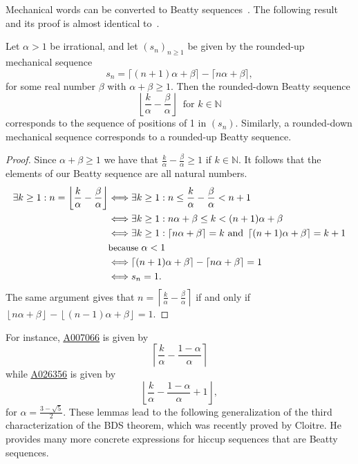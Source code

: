 \documentclass[12pt,reqno]{article}
\newcommand{\seqnum}[1]{\href{https://oeis.org/#1}{\rm \underline{#1}}}
\begin{document}
Mechanical words can be converted to Beatty sequences~\cite{beatty}.
The following result and its proof is almost identical to~\cite[Lemma 1]{bosma2018}.
\begin{lemma} Let $\alpha > 1$ be irrational, and let $(s_n)_{n \geq 1}$ be given by
the rounded-up mechanical sequence
\[ s_n=\lceil (n+1)\alpha  +\beta\rceil - \lceil n\alpha +\beta\rceil, \]
for some real number $\beta$ with $\alpha + \beta \geq 1$.
Then the rounded-down Beatty sequence
\[
\left\lfloor \frac k\alpha -\frac \beta \alpha \right\rfloor\ \text{ for }k\in \mathbb N
\]
corresponds to the sequence of positions of 1 in $(s_n)$. Similarly, a rounded-down
mechanical sequence corresponds to a rounded-up Beatty sequence.
\end{lemma}
\begin{proof} 
Since $\alpha+\beta\geq 1$ we have that $\frac k\alpha -\frac \beta \alpha\geq 1$ if $k\in\mathbb N$.
It follows that the elements of our Beatty sequence are all natural numbers.
\[
\begin{aligned}
\exists k \geq 1 : n = \left\lfloor \frac k\alpha -\frac \beta \alpha \right\rfloor 
&\Longleftrightarrow \exists k \geq 1 : n \leq \frac k\alpha -\frac \beta \alpha < n + 1 \\
&\Longleftrightarrow \exists k \geq 1 : {n\alpha+\beta} \leq k < {(n+1)\alpha+\beta} \\
&\Longleftrightarrow \exists k \geq 1 : 
\left\lceil{n\alpha+\beta} \right\rceil = k  
\text{ and } 
\left\lceil {(n+1)\alpha+\beta} \right\rceil = k + 1 \\
&\text{\small because }\alpha<1\\
&\Longleftrightarrow 
\left\lceil {(n+1)\alpha+\beta} \right\rceil 
- \left\lceil {n\alpha+\beta} \right\rceil = 1 \\
&\Longleftrightarrow s_n = 1.
\end{aligned}
\]
The same argument gives that $ n = \left\lceil \frac k\alpha -\frac \beta \alpha \right\rceil $
if and only if $\left\lfloor {n\alpha+\beta} \right\rfloor 
- \left\lfloor {(n-1)\alpha+\beta} \right\rfloor = 1$.
\end{proof}

For instance, \seqnum{A007066} is given by
\[
\left\lceil \frac{k}{\alpha}-\frac{1-\alpha}{\alpha}\right\rceil 
\]
while \seqnum {A026356} is given by
\[
\left\lfloor \frac{k}{\alpha}-\frac{1-\alpha}{\alpha}+1\right\rfloor,
\]
for $\alpha=\frac{3-\sqrt 5}{2}$.
These lemmas lead to the following generalization of the third characterization of the BDS theorem,
which was recently proved by Cloitre. He provides many more concrete expressions for hiccup
sequences that are Beatty sequences.
\end{document}
